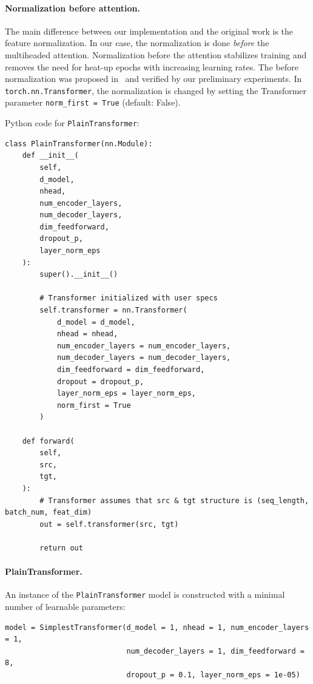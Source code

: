 \documentclass[final]{article}
\begin{document}
\paragraph{Normalization before attention.} The main difference between our implementation and  the original work is the feature normalization. In our case, the normalization is done \textit{before} the multiheaded attention. Normalization before the attention stabilizes training and removes the need for heat-up epochs with
increasing learning rates. The before normalization was proposed
in~\cite{Xiong-2020-icml} and verified by our preliminary experiments. In \texttt{torch.nn.Transformer}, the normalization is changed by
setting the Transformer parameter \texttt{norm\_first = True} (default: False).

Python code for \texttt{PlainTransformer}:
\begin{lstlisting}
class PlainTransformer(nn.Module):
    def __init__(
        self,
        d_model,
        nhead,
        num_encoder_layers,
        num_decoder_layers,
        dim_feedforward,
        dropout_p,
        layer_norm_eps
    ):
        super().__init__()

        # Transformer initialized with user specs
        self.transformer = nn.Transformer(
            d_model = d_model,
            nhead = nhead,
            num_encoder_layers = num_encoder_layers,
            num_decoder_layers = num_decoder_layers,
            dim_feedforward = dim_feedforward,
            dropout = dropout_p,
            layer_norm_eps = layer_norm_eps,
            norm_first = True
        )

    def forward(
        self,
        src,
        tgt,
    ):
        # Transformer assumes that src & tgt structure is (seq_length, batch_num, feat_dim)
        out = self.transformer(src, tgt)

        return out
\end{lstlisting}

\paragraph{PlainTransformer.}
An instance of the \texttt{PlainTransformer} model is constructed
with a minimal number of learnable parameters:
\begin{lstlisting}
model = SimplestTransformer(d_model = 1, nhead = 1, num_encoder_layers = 1,
                            num_decoder_layers = 1, dim_feedforward = 8,
                            dropout_p = 0.1, layer_norm_eps = 1e-05)
\end{lstlisting}
\end{document}
